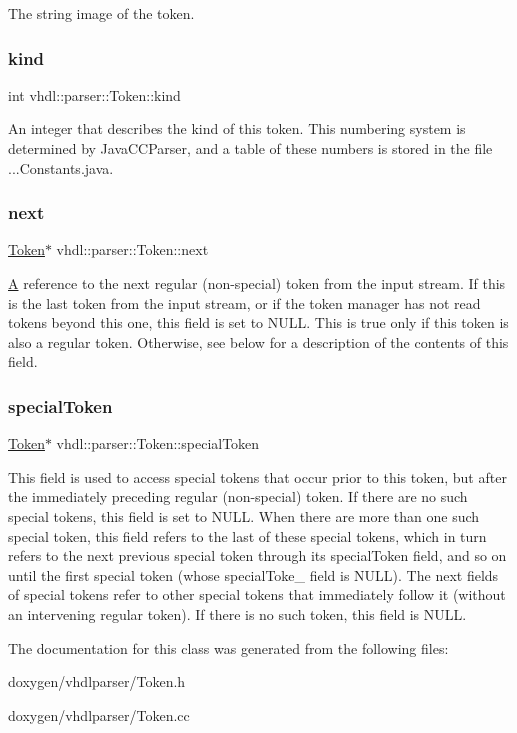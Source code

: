 The string image of the token. \mbox{\label{classvhdl_1_1parser_1_1_token_a021bfae89b9eec39a87db9577508916c}} 
\subsubsection{\texorpdfstring{kind}{kind}}
{\footnotesize\ttfamily int vhdl\+::parser\+::\+Token\+::kind}

An integer that describes the kind of this token. This numbering system is determined by Java\+C\+C\+Parser, and a table of these numbers is stored in the file ...Constants.\+java. \mbox{\label{classvhdl_1_1parser_1_1_token_a82b2c4853d3ce100b0fee664d8460b69}} 
\subsubsection{\texorpdfstring{next}{next}}
{\footnotesize\ttfamily \mbox{\hyperlink{classvhdl_1_1parser_1_1_token}{Token}}$\ast$ vhdl\+::parser\+::\+Token\+::next}

\mbox{\hyperlink{class_a}{A}} reference to the next regular (non-\/special) token from the input stream. If this is the last token from the input stream, or if the token manager has not read tokens beyond this one, this field is set to N\+U\+LL. This is true only if this token is also a regular token. Otherwise, see below for a description of the contents of this field. \mbox{\label{classvhdl_1_1parser_1_1_token_a9d02434823908bf848cdc9bb14f52b73}} 
\subsubsection{\texorpdfstring{specialToken}{specialToken}}
{\footnotesize\ttfamily \mbox{\hyperlink{classvhdl_1_1parser_1_1_token}{Token}}$\ast$ vhdl\+::parser\+::\+Token\+::special\+Token}

This field is used to access special tokens that occur prior to this token, but after the immediately preceding regular (non-\/special) token. If there are no such special tokens, this field is set to N\+U\+LL. When there are more than one such special token, this field refers to the last of these special tokens, which in turn refers to the next previous special token through its special\+Token field, and so on until the first special token (whose special\+Toke\+\_\+ field is N\+U\+LL). The next fields of special tokens refer to other special tokens that immediately follow it (without an intervening regular token). If there is no such token, this field is N\+U\+LL. 

The documentation for this class was generated from the following files\+:\begin{DoxyCompactItemize}
\item 
doxygen/vhdlparser/Token.\+h\item 
doxygen/vhdlparser/Token.\+cc\end{DoxyCompactItemize}
